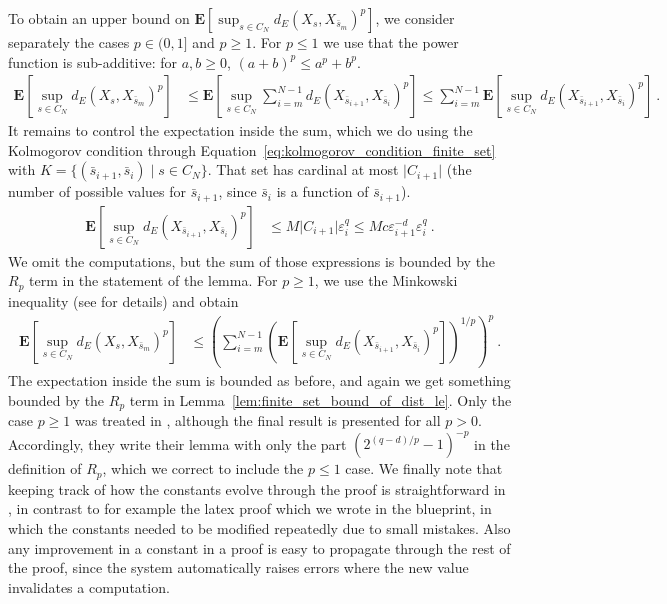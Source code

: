 \documentclass[lean]{Draft}
\begin{document}
To obtain an upper bound on $\mathbf{E}\left[\sup_{s \in C_N} d_E(X_s, X_{\bar{s}_m})^p\right]$, we consider separately the cases $p \in (0, 1]$ and $p \ge 1$.
For $p \le 1$ we use that the power function is sub-additive: for $a, b \ge 0$, $(a + b)^p \le a^p + b^p$.
\begin{align*}
  \mathbf{E}\left[\sup_{s \in C_N} d_E(X_s, X_{\bar{s}_m})^p\right]
  &\le \mathbf{E}\left[\sup_{s \in C_N} \sum_{i=m}^{N-1} d_E(X_{\bar{s}_{i+1}}, X_{\bar{s}_i})^p\right]
  \le \sum_{i=m}^{N-1} \mathbf{E}\left[\sup_{s \in C_N} d_E(X_{\bar{s}_{i+1}}, X_{\bar{s}_i})^p\right]
  \: .
\end{align*}
It remains to control the expectation inside the sum, which we do using the Kolmogorov condition through Equation~\eqref{eq:kolmogorov_condition_finite_set} with $K = \{(\bar{s}_{i+1}, \bar{s}_i) \mid s \in C_N\}$. That set has cardinal at most $\lvert C_{i+1} \rvert$ (the number of possible values for $\bar{s}_{i+1}$, since $\bar{s}_i$ is a function of $\bar{s}_{i+1}$).
\begin{align*}
  \mathbf{E}\left[\sup_{s \in C_N} d_E(X_{\bar{s}_{i+1}}, X_{\bar{s}_i})^p\right]
  &\le M \lvert C_{i+1} \rvert \varepsilon_i^q
  \le M c \varepsilon_{i+1}^{-d} \varepsilon_i^{q}
  \: .
\end{align*}
We omit the computations, but the sum of those expressions is bounded by the $R_p$ term in the statement of the lemma.
For $p \ge 1$, we use the Minkowski inequality (see \cite{kratschmer2023kolmogorov} for details) and obtain
\begin{align*}
  \mathbf{E}\left[\sup_{s \in C_N} d_E(X_s, X_{\bar{s}_m})^p\right]
  &\le \left( \sum_{i=m}^{N-1} \left( \mathbf{E}\left[\sup_{s \in C_N} d_E(X_{\bar{s}_{i+1}}, X_{\bar{s}_i})^p\right] \right)^{1/p} \right)^p
  \: .
\end{align*}
The expectation inside the sum is bounded as before, and again we get something bounded by the $R_p$ term in Lemma~\ref{lem:finite_set_bound_of_dist_le}.
Only the case $p \ge 1$ was treated in \cite{kratschmer2023kolmogorov}, although the final result is presented for all $p > 0$.
Accordingly, they write their lemma with only the part $(2^{(q-d)/p} - 1)^{-p}$ in the definition of $R_p$, which we correct to include the $p \le 1$ case.
We finally note that keeping track of how the constants evolve through the proof is straightforward in \Lean, in contrast to for example the latex proof which we wrote in the blueprint, in which the constants needed to be modified repeatedly due to small mistakes.
Also any improvement in a constant in a \Lean proof is easy to propagate through the rest of the proof, since the system automatically raises errors where the new value invalidates a computation.
\end{document}
